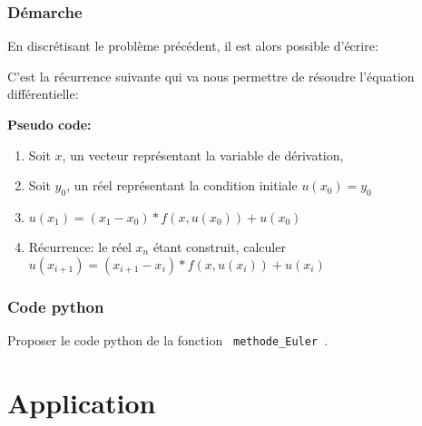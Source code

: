 \begin{frame}[fragile]
\frametitle{Démarche}

En discrétisant le problème précédent, il est alors possible d'écrire:
\begin{center}
\end{center}

C'est la récurrence suivante qui va nous permettre de résoudre l'équation différentielle:
\begin{center}
\end{center}

\textbf{Pseudo code:}
\begin{enumerate}
 \item Soit $x$, un vecteur représentant la variable de dérivation,
 \item Soit $y_0$, un réel représentant la condition initiale $u(x_{0})=y_0$
 \item $u(x_{1})=(x_{1}-x_{0})*f(x,u(x_{0}))+u(x_{0})$
 \item Récurrence: le réel $x_n$ étant construit, calculer $u(x_{i+1})=(x_{i+1}-x_{i})*f(x,u(x_{i}))+u(x_{i})$
\end{enumerate}
\end{frame}

\begin{frame}[fragile]
\frametitle{Code python}

Proposer le code python de la fonction \verb? methode_Euler ?.
\begin{GrayBox}[0.85\textwidth]
\begin{semiverbatim}\small
{}
   \end{semiverbatim}
\end{GrayBox}
\end{frame}

\section{Application}

